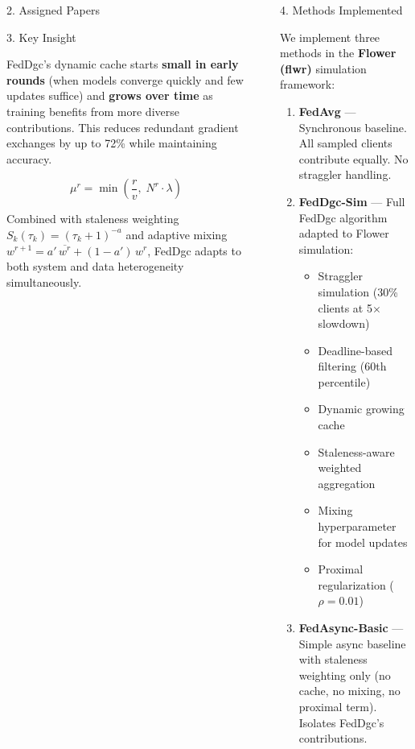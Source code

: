 \documentclass[final]{beamer}
\newlength{\sepwidth}
\newlength{\colwidth}
\newcommand{\separatorcolumn}{\begin{column}{\sepwidth}\end{column}}
\begin{document}
\begin{frame}[t]
\begin{columns}[t]
\begin{column}{\colwidth}
\begin{block}{2. Assigned Papers}
  \end{block}

  \begin{alertblock}{3. Key Insight}

    FedDgc's dynamic cache starts \textbf{small in early rounds} (when models converge quickly and few updates suffice) and \textbf{grows over time} as training benefits from more diverse contributions. This reduces redundant gradient exchanges by up to 72\% while maintaining accuracy.

    $$\mu^r = \min\!\left(\frac{r}{v},\; N^r \cdot \lambda\right)$$

    Combined with staleness weighting $S_k(\tau_k) = (\tau_k + 1)^{-a}$ and adaptive mixing $w^{r+1} = a'\,\overline{w^r} + (1-a')\,w^r$, FedDgc adapts to both system and data heterogeneity simultaneously.

  \end{alertblock}

\end{column}

\separatorcolumn

\begin{column}{\colwidth}

  \begin{block}{4. Methods Implemented}

    We implement three methods in the \textbf{Flower (flwr)} simulation framework:

    \begin{enumerate}
      \item \textbf{FedAvg} --- Synchronous baseline. All sampled clients contribute equally. No straggler handling.
      \item \textbf{FedDgc-Sim} --- Full FedDgc algorithm adapted to Flower simulation:
        \begin{itemize}
          \item Straggler simulation (30\% clients at 5$\times$ slowdown)
          \item Deadline-based filtering (60th percentile)
          \item Dynamic growing cache
          \item Staleness-aware weighted aggregation
          \item Mixing hyperparameter for model updates
          \item Proximal regularization ($\rho = 0.01$)
        \end{itemize}
      \item \textbf{FedAsync-Basic} --- Simple async baseline with staleness weighting only (no cache, no mixing, no proximal term). Isolates FedDgc's contributions.
    \end{enumerate}


\end{block}
\end{column}
\end{columns}
\end{frame}
\end{document}
